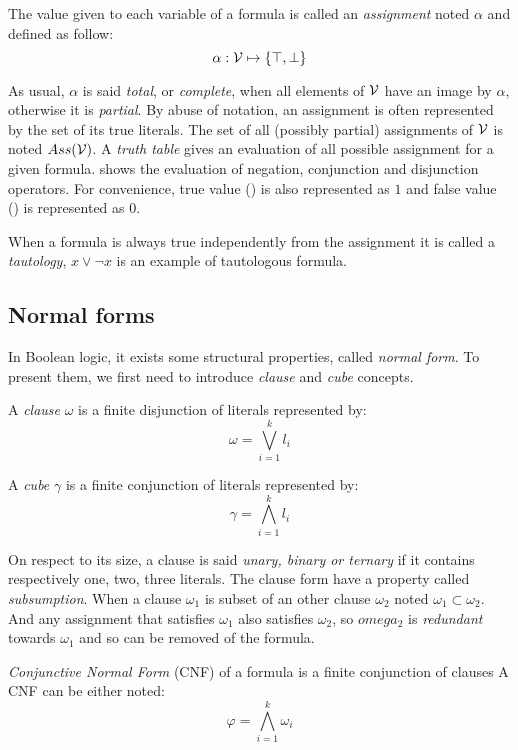 The value given to each variable of a formula is called an \emph{assignment} noted $\alpha$ and defined as follow:
	$$\alpha: \mathcal{V} \mapsto \{ \top, \bot \}$$

 As usual, $\alpha$ is said \emph{total}, or \emph{complete}, when all elements of $\mathcal{V}$ have an image by
$\alpha$, otherwise it is \emph{partial}. By abuse of notation, an assignment is
often represented by the set of its true literals.  The set of all (possibly
partial) assignments of $\mathcal{V}$ is noted $Ass(\mathcal{V})$.
A \emph{truth table} gives an evaluation of all possible assignment for a given formula.
 shows the evaluation of negation, conjunction and disjunction operators.
For convenience, true value (\true) is also represented as $1$ and false value (\false) is represented as $0$.

When a formula is always true independently from the assignment it is called a \emph{tautology}, $x \lor \neg x$ is 
an example of tautologous formula.



\subsection{Normal forms}

In Boolean logic, it exists some structural properties, called \emph{normal form}.
To present them, we first need to introduce \emph{clause} and \emph{cube} concepts.

A \emph{clause} $\omega$ is a finite disjunction of literals represented by:
 $$\omega = \bigvee_{i=1}^k l_i$$
 
 
A \emph{cube} $\gamma$ is a finite conjunction of literals represented by:
$$\gamma = \bigwedge_{i=1}^k l_i$$


On respect to its size, a clause is said \emph{unary, binary or ternary} if it contains respectively one, two, three literals.
The clause form have a property called \emph{subsumption}. 
When a clause $\omega_1$ is subset of an other clause $\omega_2$ noted $\omega_1 \subset \omega_2$. And any 
assignment that satisfies $\omega_1$ also satisfies $\omega_2$, so $omega_2$ is \emph{redundant} towards $\omega_1$ and so 
can be removed of the formula.

\emph{Conjunctive Normal Form} (CNF) of a formula is a finite conjunction of clauses
 A CNF can be either noted:
  $$\varphi = \bigwedge_{i=1}^k \omega_i$$
  
